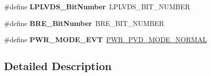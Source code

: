 \begin{DoxyCompactItemize}
\mbox{\label{group___h_a_l___p_w_r___aliased_ga7ebe7d965ce7638645ee9a5e35c01be7}} 
\#define {\bfseries L\+P\+L\+V\+D\+S\+\_\+\+Bit\+Number}~L\+P\+L\+V\+D\+S\+\_\+\+B\+I\+T\+\_\+\+N\+U\+M\+B\+ER
\item 
\mbox{\label{group___h_a_l___p_w_r___aliased_ga1a0832bfe421cdd6f2640ffb625cc2d8}} 
\#define {\bfseries B\+R\+E\+\_\+\+Bit\+Number}~B\+R\+E\+\_\+\+B\+I\+T\+\_\+\+N\+U\+M\+B\+ER
\item 
\mbox{\label{group___h_a_l___p_w_r___aliased_ga1092f618f6edca6f56e410e926455774}} 
\#define {\bfseries P\+W\+R\+\_\+\+M\+O\+D\+E\+\_\+\+E\+VT}~\hyperlink{group___p_w_r___p_v_d___mode_ga3a4bf701a36a14a4edf4dc5a28153277}{P\+W\+R\+\_\+\+P\+V\+D\+\_\+\+M\+O\+D\+E\+\_\+\+N\+O\+R\+M\+AL}
\end{DoxyCompactItemize}


\subsection{Detailed Description}
